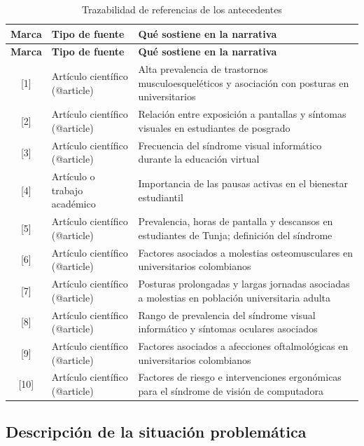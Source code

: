 \bigskip
\begin{center}
\begin{longtable}{c L{4.3cm} L{8.4cm}}
\caption{Trazabilidad de referencias de los antecedentes} \\
\toprule
\textbf{Marca} & \textbf{Tipo de fuente} & \textbf{Qué sostiene en la narrativa} \\
\midrule
\endfirsthead
\toprule
\textbf{Marca} & \textbf{Tipo de fuente} & \textbf{Qué sostiene en la narrativa} \\
\midrule
\endhead
{[1]} & Artículo científico (@article) & Alta prevalencia de trastornos musculoesqueléticos y asociación con posturas en universitarios \\
{[2]} & Artículo científico (@article) & Relación entre exposición a pantallas y síntomas visuales en estudiantes de posgrado \\
{[3]} & Artículo científico (@article) & Frecuencia del síndrome visual informático durante la educación virtual \\
{[4]} & Artículo o trabajo académico & Importancia de las pausas activas en el bienestar estudiantil \\
{[5]} & Artículo científico (@article) & Prevalencia, horas de pantalla y descansos en estudiantes de Tunja; definición del síndrome \\
{[6]} & Artículo científico (@article) & Factores asociados a molestias osteomusculares en universitarios colombianos \\
{[7]} & Artículo científico (@article) & Posturas prolongadas y largas jornadas asociadas a molestias en población universitaria adulta \\
{[8]} & Artículo científico (@article) & Rango de prevalencia del síndrome visual informático y síntomas oculares asociados \\
{[9]} & Artículo científico (@article) & Factores asociados a afecciones oftalmológicas en universitarios colombianos \\
{[10]} & Artículo científico (@article) & Factores de riesgo e intervenciones ergonómicas para el síndrome de visión de computadora \\
\bottomrule
\end{longtable}
\end{center}

\subsection{Descripción de la situación problemática}

